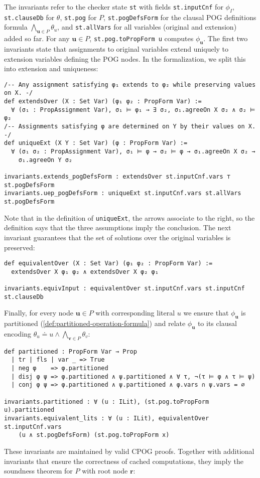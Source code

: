\documentclass[letterpaper,USenglish,cleveref, autoref, thm-restate]{lipics-v2021}
\newcommand{\inputformula}{\phi_I}
\newcommand{\makenode}[1]{\mathbf{#1}}
\newcommand{\nodeu}{\makenode{u}}
\newcommand{\nodev}{\makenode{v}}
\newcommand{\noder}{\makenode{r}}
\begin{document}
The invariants refer to the checker state \lstinline{st} with fields \lstinline{st.inputCnf} for $\inputformula$, \lstinline{st.clauseDb} for $\theta$, \lstinline{st.pog} for $P$, \lstinline{st.pogDefsForm} for the clausal POG definitions formula $\bigwedge_{\nodeu\in P}\theta_u$, and \lstinline{st.allVars} for all variables (original and extension) added so far. For any $\nodeu\in P$, \lstinline{st.pog.toPropForm u} computes $\phi_\nodeu$. The first two invariants state that assignments to original variables extend uniquely to extension variables defining the POG nodes. In the formalization, we split this into extension and uniqueness:
\begin{lstlisting}
/-- Any assignment satisfying φ₁ extends to φ₂ while preserving values on X. -/
def extendsOver (X : Set Var) (φ₁ φ₂ : PropForm Var) :=
  ∀ (σ₁ : PropAssignment Var), σ₁ ⊨ φ₁ → ∃ σ₂, σ₁.agreeOn X σ₂ ∧ σ₂ ⊨ φ₂
/-- Assignments satisfying φ are determined on Y by their values on X. -/
def uniqueExt (X Y : Set Var) (φ : PropForm Var) :=
  ∀ (σ₁ σ₂ : PropAssignment Var), σ₁ ⊨ φ → σ₂ ⊨ φ → σ₁.agreeOn X σ₂ →
    σ₁.agreeOn Y σ₂

invariants.extends_pogDefsForm : extendsOver st.inputCnf.vars ⊤ st.pogDefsForm
invariants.uep_pogDefsForm : uniqueExt st.inputCnf.vars st.allVars st.pogDefsForm
\end{lstlisting}
Note that in the definition of \lstinline{uniqueExt}, the arrows associate to the right,
so the definition says that the three assumptions imply the conclusion.
The next invariant guarantees that the set of solutions over the original variables is preserved:
\begin{lstlisting}
def equivalentOver (X : Set Var) (φ₁ φ₂ : PropForm Var) :=
  extendsOver X φ₁ φ₂ ∧ extendsOver X φ₂ φ₁

invariants.equivInput : equivalentOver st.inputCnf.vars st.inputCnf st.clauseDb
\end{lstlisting}
Finally, for every node $\nodeu\in P$ with corresponding literal $u$ we ensure that $\phi_\nodeu$ is partitioned (\cref{def:partitioned-operation-formula}) and relate $\phi_\nodeu$ to its clausal encoding $\theta_u \doteq u \wedge \bigwedge_{\nodev\in P}\theta_v$:
\begin{lstlisting}
def partitioned : PropForm Var → Prop
  | tr | fls | var _ => True
  | neg φ    => φ.partitioned
  | disj φ ψ => φ.partitioned ∧ ψ.partitioned ∧ ∀ τ, ¬(τ ⊨ φ ∧ τ ⊨ ψ)
  | conj φ ψ => φ.partitioned ∧ ψ.partitioned ∧ φ.vars ∩ ψ.vars = ∅

invariants.partitioned : ∀ (u : ILit), (st.pog.toPropForm u).partitioned
invariants.equivalent_lits : ∀ (u : ILit), equivalentOver st.inputCnf.vars
    (u ∧ st.pogDefsForm) (st.pog.toPropForm x)
\end{lstlisting}
These invariants are maintained by valid CPOG proofs. Together with additional invariants
that ensure the correctness of cached computations, they imply the soundness theorem for $P$ with root
node $\noder$:
\end{document}
